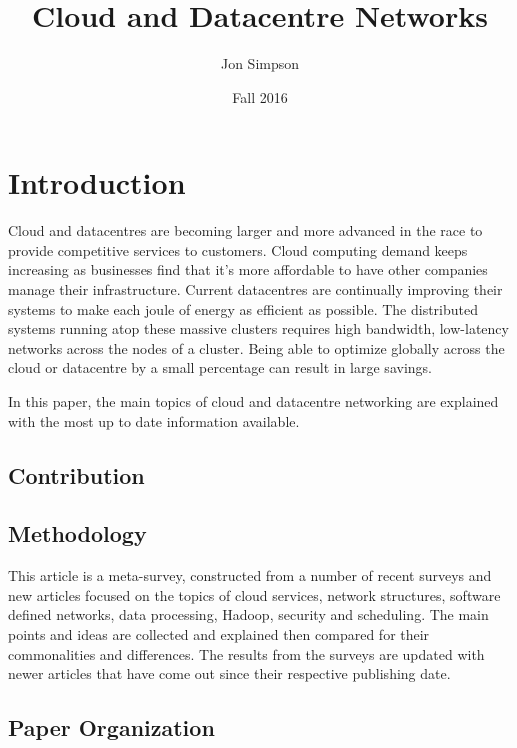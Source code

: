 \documentclass[fullapage,12pt]{article}
\title{Cloud and Datacentre Networks}
\author{Jon Simpson}
\date{Fall 2016}
\begin{document}
\begin{titlepage}
\maketitle
\thispagestyle{empty}
\end{titlepage}

\section{Introduction} \label{sec:introduction}

Cloud and datacentres are becoming larger and more advanced in the race to provide competitive services to customers. Cloud computing demand keeps increasing as businesses find that it's more affordable to have other companies manage their infrastructure. Current datacentres are continually improving their systems to make each joule of energy as efficient as possible. The distributed systems running atop these massive clusters requires high bandwidth, low-latency networks across the nodes of a cluster. Being able to optimize globally across the cloud or datacentre by a small percentage can result in large savings.

In this paper, the main topics of cloud and datacentre networking are explained with the most up to date information available.



\subsection{Contribution} \label{sub:contribution}

\subsection{Methodology} \label{sub:methodology}

This article is a meta-survey, constructed from a number of recent surveys and new articles focused on the topics of cloud services, network structures, software defined networks, data processing, Hadoop, security and scheduling. The main points and ideas are collected and explained then compared for their commonalities and differences. The results from the surveys are updated with newer articles that have come out since their respective publishing date.

\subsection{Paper Organization} \label{sub:organization}
\end{document}
